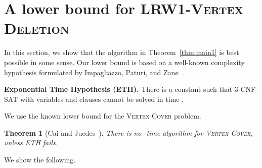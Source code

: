 \documentclass[11pt]{article}
\newtheorem{theorem}{Theorem}[section]
\theoremstyle{remark}
\newcommand{\LRWD}{\textsc{LRW1-Vertex Deletion} }
\begin{document}
\section{A lower bound for \LRWD}\label{sec:lowerbound}
In this section, we show that the algorithm in Theorem~\ref{thm:main1} is best possible in some sense. 
Our lower bound is based on a well-known complexity hypothesis formulated by Impagliazzo, Paturi, and Zane~\cite{ImpagliazzoRF2001}.

\medskip
\medskip
	\textbf{Exponential Time Hypothesis (ETH).} There is a constant  such that \textsc{3-CNF-SAT} with  variables and  clauses cannot be solved in time .

\medskip
\medskip



We use the known lower bound for the \textsc{Vertex Cover} problem.


\smallskip
\noindent
{}

\begin{theorem}[Cai and Juedes~\cite{Cai2003}]\label{thm:vclow}
There is no -time algorithm for \textsc{Vertex Cover}, unless ETH fails.
\end{theorem}

We show the following.
\end{document}

